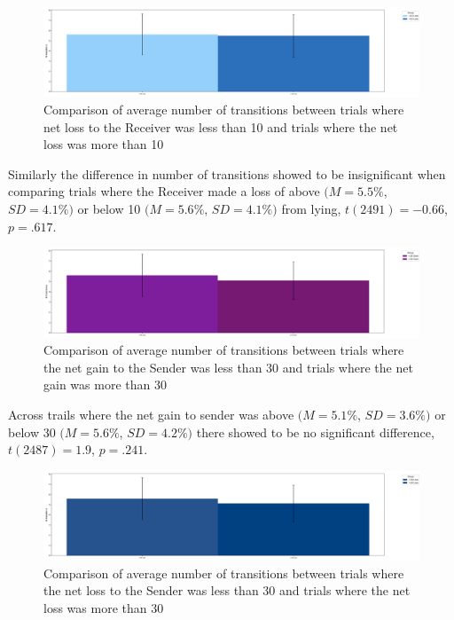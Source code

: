 \documentclass[man, floatsintext]{apa7}
\begin{document}
\begin{figure}[H]
	\includegraphics[width=\linewidth]{../plots/RESPONSE/NTransitionPerLossPlot.png}
	\caption{Comparison of average number of transitions between trials where net loss to the Receiver was less than 10 and trials where the net loss was more than 10}
	\label{fig:NTransitionPerLoss}
\end{figure}

Similarly the difference in number of transitions showed to be insignificant when comparing trials where the Receiver made a loss of above $(M = 5.5\%$, $SD = 4.1\%)$  or below 10 $(M = 5.6\%$, $SD = 4.1\%)$ from lying, $t(2491)=-0.66$, $p=.617$.

\begin{figure}[H]
	\includegraphics[width=\linewidth]{../plots/RESPONSE/NTransitionPerGain30.png}
	\caption{Comparison of average number of transitions between trials where the net gain to the Sender was less than 30 and trials where the net gain was more than 30}
	\label{fig:NTransitionPerGain30}
\end{figure}

Across trails where the net gain to sender was above $(M = 5.1\%$, $SD = 3.6\%)$ or below 30  $(M = 5.6\%$, $SD = 4.2\%)$  there showed to be no significant difference, $t(2487)=1.9$, $p=.241$.

\begin{figure}[H]
	\includegraphics[width=\linewidth]{../plots/RESPONSE/NTransitionPerLossPlot30.png}
	\caption{Comparison of average number of transitions between trials where the net loss to the Sender was less than 30 and trials where the net loss was more than 30}
	\label{fig:NTransitionPerLoss30}
\end{figure}
\end{document}

